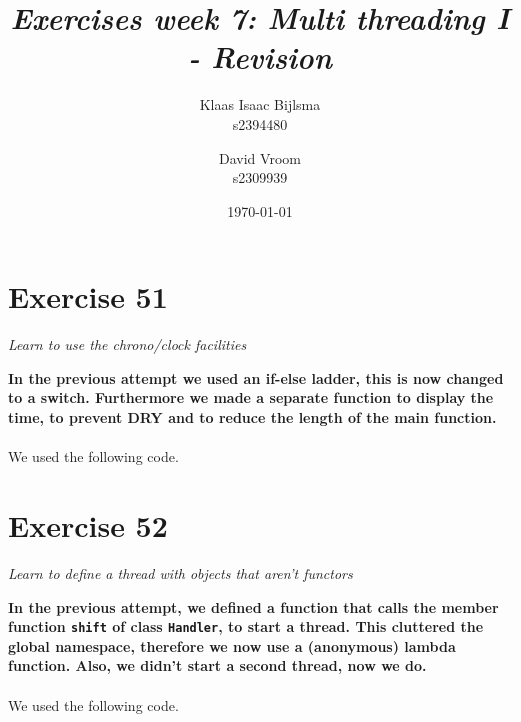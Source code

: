 \documentclass[12pt]{article}
\title{\itshape Exercises week 7: Multi threading I - Revision}
\author{
	Klaas Isaac Bijlsma \\ s2394480
	\and
	David Vroom \\ s2309939
}
\date{\today}
\newcommand{\desc}[1]{\textit{#1} \vspace{1em}}
\begin{document}
\maketitle

\section*{Exercise 51}
\desc{Learn to use the chrono/clock facilities}

\textbf{In the previous attempt we used an if-else ladder, this is now changed to a switch. Furthermore we made a separate function to display the time, to prevent DRY and to reduce the length of the main function.}\\
\\
We used the following code.





\clearpage

\section*{Exercise 52}
\desc{Learn to define a thread with objects that aren't functors}

\textbf{In the previous attempt, we defined a function that calls the member function \texttt{shift} of class \texttt{Handler}, to start a thread. This cluttered the global namespace, therefore we now use a (anonymous)  lambda function. Also, we didn't start a second thread, now we do.}\\
\\
We used the following code.

    
    
    


\clearpage
\end{document}

